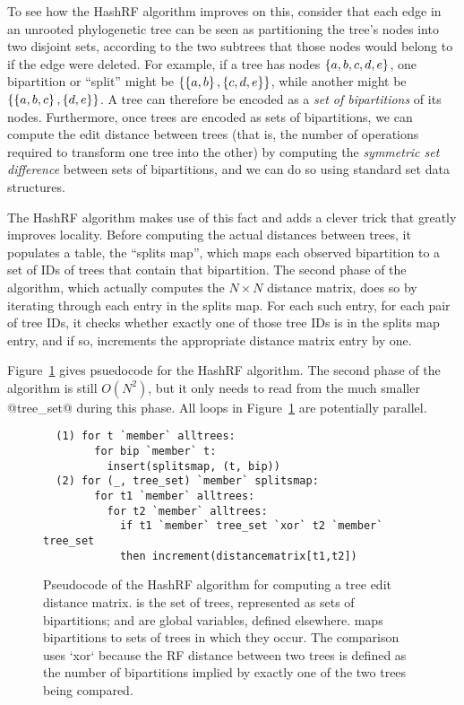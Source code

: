 To see how the HashRF algorithm improves on this, consider that each
edge in an unrooted phylogenetic tree can be seen as partitioning the
tree's nodes into two disjoint sets, according to the two subtrees
that those nodes would belong to if the edge were deleted.  For
example, if a tree has nodes $\left\{a, b, c, d, e\right\}$, one bipartition
or ``split'' might be $\left\{\left\{a, b\right\}, \left\{c, d, e\right\}\right\}$, while
another might be $\left\{\left\{a, b, c\right\}, \left\{d, e\right\}\right\}$.  A tree can
therefore be encoded as a \emph{set of bipartitions} of its nodes.
Furthermore, once trees are encoded as sets of bipartitions, we can
compute the edit distance between trees (that is, the number of
operations required to transform one tree into the other) by computing
the \emph{symmetric set difference} between sets of bipartitions, and
we can do so using standard set data structures.

The HashRF algorithm makes use of this fact and adds a clever trick
that greatly improves locality.  Before computing the actual distances
between trees, it populates a table, the ``splits map'', which maps
each observed bipartition to a set of IDs of trees that contain that
bipartition.  The second phase of the algorithm, which actually
computes the $N \times N$ distance matrix, does so by iterating
through each entry in the splits map.  For each such entry, for each
pair of tree IDs, it checks whether exactly one of those tree IDs is
in the splits map entry, and if so, increments the appropriate
distance matrix entry by one.

Figure~\ref{f:hashrf-alg} gives psuedocode for the HashRF algorithm.
The second phase of the algorithm is still $O(N^2)$, but it only needs
to read from the much smaller @tree_set@ during this phase.  All loops
in Figure~\ref{f:hashrf-alg} are potentially parallel.


\begin{figure}
\begin{lstlisting}
  (1) for t `member` alltrees:
        for bip `member` t:
          insert(splitsmap, (t, bip))
  (2) for (_, tree_set) `member` splitsmap: 
        for t1 `member` alltrees:
          for t2 `member` alltrees:
            if t1 `member` tree_set `xor` t2 `member` tree_set
            then increment(distancematrix[t1,t2])
\end{lstlisting}  
  \caption{Pseudocode of the HashRF algorithm for computing a tree
    edit distance matrix.   is the set of trees,
    represented as sets of bipartitions;  and
     are global variables, defined elsewhere.
     maps bipartitions to sets of trees in which they
    occur. The comparison uses `xor` because the RF distance between
    two trees is defined as the number of bipartitions implied by
    exactly one of the two trees being compared.}
  \label{f:hashrf-alg}
\end{figure}

